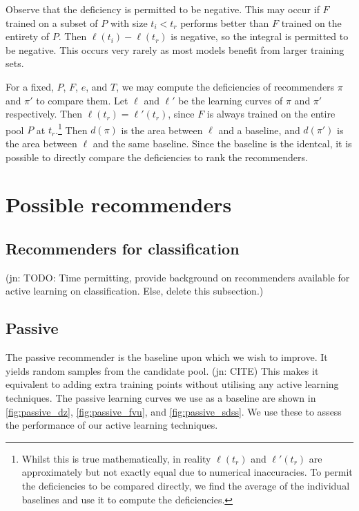 \documentclass[11pt,twoside,openright]{report}
\newcommand\jn[1]{{\color{red}(jn: #1)}}
\begin{document}
Observe that the deficiency is permitted to be negative. This may occur if $F$ trained on a subset of $P$ with size $t_i < t_r$ performs better than $F$ trained on the entirety of $P$. Then $\ell(t_i) - \ell(t_r)$ is negative, so the integral is permitted to be negative. This occurs very rarely as most models benefit from larger training sets.

For a fixed, $P$, $F$, $e$, and $T$, we may compute the deficiencies of recommenders $\pi$ and $\pi'$ to compare them. Let $\ell$ and $\ell'$ be the learning curves of $\pi$ and $\pi'$ respectively. Then $\ell(t_r) = \ell'(t_r)$, since $F$ is always trained on the entire pool $P$ at $t_r$.\footnote{Whilst this is true mathematically, in reality $\ell(t_r)$ and $\ell'(t_r)$ are approximately but not exactly equal due to numerical inaccuracies. To permit the deficiencies to be compared directly, we find the average of the individual baselines and use it to compute the deficiencies.} Then $d(\pi)$ is the area between $\ell$ and a baseline, and $d(\pi')$ is the area between $\ell$ and the same baseline. Since the baseline is the identcal, it is possible to directly compare the deficiencies to rank the recommenders.

\section{Possible recommenders}

\subsection{Recommenders for classification}

\jn{TODO: Time permitting, provide background on recommenders available for active learning on classification. Else, delete this subsection.}

\subsection{Passive}

The passive recommender is the baseline upon which we wish to improve. It yields random samples from the candidate pool. \jn{CITE} This makes it equivalent to adding extra training points without utilising any active learning techniques. The passive learning curves we use as a baseline are shown in \cref{fig:passive_dz}, \cref{fig:passive_fvu}, and \cref{fig:passive_sdss}. We use these to assess the performance of our active learning techniques.
\end{document}
